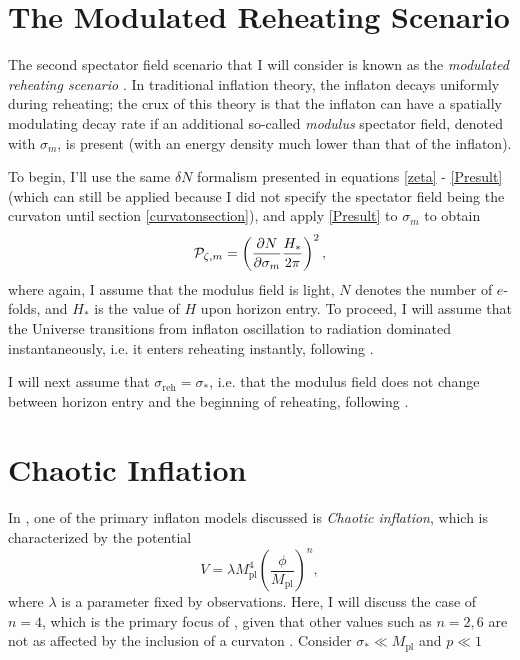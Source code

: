 \documentclass[12pt]{article}
\newcommand{\pmo}{\mathcal{P}_{\zeta,m}}
\begin{document}
\section{The Modulated Reheating Scenario}
\par The second spectator field scenario that I will consider is known as the \textit{modulated reheating scenario} \cite{modul}. In traditional inflation theory, the inflaton decays uniformly during reheating; the crux of this theory is that the inflaton can have a spatially modulating decay rate if an additional so-called \textit{modulus} spectator field, denoted with $\sigma_{m}$, is present (with an energy density much lower than that of the inflaton).
\par To begin, I'll use the same $\delta N$ formalism presented in equations \eqref{zeta} - \eqref{Presult} (which can still be applied because I did not specify the spectator field being the curvaton until section \ref{curvatonsection}), and apply \eqref{Presult} to $\sigma_m$ to obtain
\begin{equation}
    \pmo =\left(\pdv{N}{\sigma_m}\frac{H_*}{2\pi}\right)^2,
\end{equation}
where again, I assume that the modulus field is light, $N$ denotes the number of $e$-folds, and $H_*$ is the value of $H$ upon horizon entry. To proceed, I will assume that the Universe transitions from inflaton oscillation to radiation dominated instantaneously, i.e. it enters reheating instantly, following \cite{modul}.
\par I will next assume that $\sigma_\text{reh}=\sigma_*$, i.e. that the modulus field does not change between horizon entry and the beginning of reheating, following \cite{modul}.
\section{Chaotic Inflation}
\par In \cite{curvaton}, one of the primary inflaton models discussed is \textit{Chaotic inflation}, which is characterized by the potential
\begin{equation}
    V=\lambda M^4_\text{pl}\left(\frac{\phi}{M_\text{pl}}\right)^n,
\end{equation}
where $\lambda$ is a parameter fixed by observations. Here, I will discuss the case of $n=4$, which is the primary focus of \cite{curvaton}, given that other values such as $n=2,6$ are not as affected by the inclusion of a curvaton \cite{curvaton}.
Consider $\sigma_* \ll M_\text{pl}$ and $p\ll 1$
\end{document}
